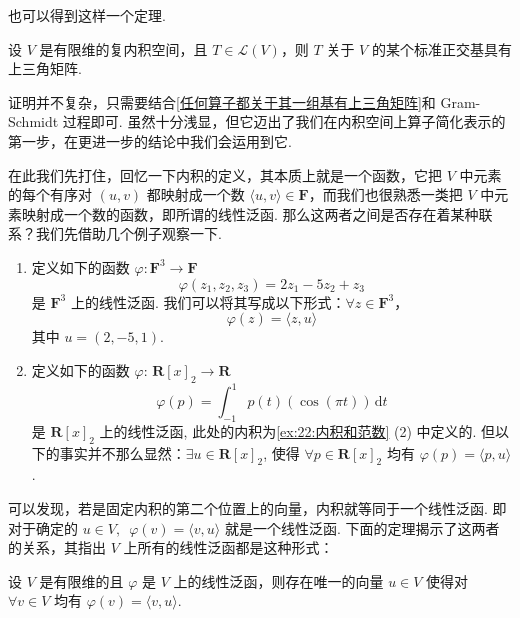 也可以得到这样一个定理. 

\begin{theorem}  
    设 $ V $ 是有限维的复内积空间，且 $ T \in \mathcal{L}(V) $，则 $ T $ 关于 $ V $ 的某个标准正交基具有上三角矩阵. 
\end{theorem}

证明并不复杂，只需要结合\ref{任何算子都关于其一组基有上三角矩阵}和 Gram-Schmidt 过程即可. 
虽然十分浅显，但它迈出了我们在内积空间上算子简化表示的第一步，在更进一步的结论中我们会运用到它. 

在此我们先打住，回忆一下内积的定义，其本质上就是一个函数，它把 $ V $ 中元素的每个有序对 $(u, v)$ 都映射成一个数
$ \langle u, v \rangle \in \mathbf{F}$，而我们也很熟悉一类把 $ V $ 中元素映射成一个数的函数，即所谓的线性泛函.
那么这两者之间是否存在着某种联系？我们先借助几个例子观察一下.

\begin{example}
    \begin{enumerate}
        \item 定义如下的函数 $\varphi : \mathbf{F}^{3} \rightarrow \mathbf{F}$
        \[\varphi(z_1, z_2, z_3) = 2z_1 - 5z_2 + z_3\]
        是 $\mathbf{F}^{3}$ 上的线性泛函. 我们可以将其写成以下形式：$ \forall z \in \mathbf{F}^{3}$，
        \[\varphi(z) = \langle z, u\rangle\]
        其中 $u = (2, -5, 1)$.

        \item 定义如下的函数 $\varphi$: $\mathbf{R}[x]_2 \rightarrow \mathbf{R}$
        \[\varphi(p) = \int_{-1}^1 p(t)(\cos(\pi t))\,\mathrm{d}t\]
        是 $\mathbf{R}[x]_2$ 上的线性泛函, 此处的内积为\autoref{ex:22:内积和范数} (2) 中定义的.
        但以下的事实并不那么显然：$ \exists u \in \mathbf{R}[x]_2$, 使得
        $\forall p \in \mathbf{R}[x]_2$ 均有 $ \varphi (p) = \langle p, u\rangle $.
    \end{enumerate}
\end{example}

可以发现，若是固定内积的第二个位置上的向量，内积就等同于一个线性泛函. 即对于确定的 $ u \in V , \enspace \varphi(v) = \langle v, u \rangle$ 就是一个线性泛函.
下面的定理揭示了这两者的关系，其指出 $ V $ 上所有的线性泛函都是这种形式：
\begin{theorem} 
    设 $ V $ 是有限维的且 $ \varphi $ 是 $ V $ 上的线性泛函，则存在唯一的向量
    $u \in V$ 使得对 $\forall v \in V$ 均有 $ \varphi(v) = \langle v, u\rangle $.
\end{theorem}

